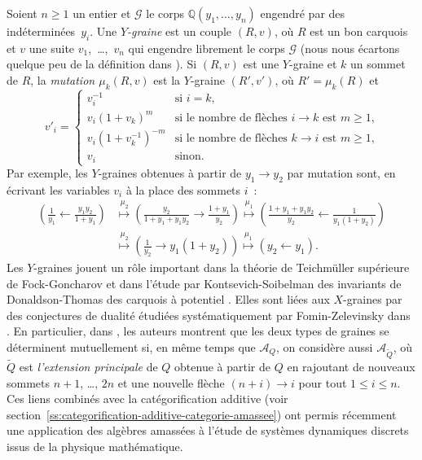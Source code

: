 \documentclass[brochure,12pt]{bourbaki}
\numberwithin{equation}{subsection}
\numberwithin{theorem}{section}
\newcommand{\Q}{\mathbb{Q}}
\newcommand{\la}{\leftarrow}
\newcommand{\ca}{{\mathcal A}}
\newcommand{\cg}{{\mathcal G}}
\renewcommand{\tilde}[1]{\widetilde{#1}}
\newcommand{\maparr}[1]{\stackrel{#1}{\mapsto}}
\begin{document}
Soient $n\geq 1$ un entier et $\cg$ le corps $\Q(y_1, \ldots, y_n)$
engendr\'e par des ind\'etermi\-n\'ees~$y_i$. Une {\em $Y$-graine} est un couple $(R,v)$, o\`u
$R$ est un bon carquois et $v$ une suite \mbox{$v_1$, \ldots, $v_n$}
qui engendre librement le corps $\cg$ (nous nous \'ecartons quelque peu de la d\'efinition
dans \cite{FominZelevinsky07}). Si $(R,v)$ est une
$Y$-graine et $k$ un sommet de $R$, la {\em mutation $\mu_k(R,v)$}
est la $Y$-graine $(R',v')$, o\`u $R'=\mu_k(R)$ et
\[
v'_i=\left\{ \begin{array}{ll} v_i^{-1} & \mbox{si $i=k$,} \\
v_i (1+v_k)^m & \mbox{si le nombre de fl\`eches $i\to k$ est $m\geq 1$,} \\
v_i (1+v_k^{-1})^{-m} & \mbox{si le nombre de fl\`eches $k\to i$ est $m\geq 1$,}\\
v_i & \mbox{sinon.}
\end{array} \right.
\]
Par exemple, les $Y$-graines obtenues \`a partir de $y_1 \to y_2$ par
mutation sont, en \'ecrivant les variables $v_i$ \`a la place
des sommets $i$~:
\begin{align*}
\left( \frac{1}{y_1} \la \frac{y_1 y_2}{1+y_1} \right) &\maparr{\mu_2}
\left( \frac{y_2}{1+y_1+y_1y_2} \to \frac{1+y_1}{y_2} \right) \maparr{\mu_1}
\left( \frac{1+y_1+y_1y_2}{y_2} \la \frac{1}{y_1(1+y_2)} \right) \\
 &\maparr{\mu_2} \left( \frac{1}{y_2} \to y_1(1+y_2) \right) \maparr{\mu_1} \left( y_2 \la y_1 \right).
\end{align*}
Les $Y$-graines jouent un r\^ole important dans la th\'eorie de
Teichm\"uller sup\'erieure de Fock-Goncharov \cite{FockGoncharov03} \cite{FockGoncharov06a}
et dans l'\'etude par Kontsevich-Soibelman \cite{KontsevichSoibelman08}
des invariants de Donaldson-Thomas des carquois \`a potentiel \cite{DerksenWeymanZelevinsky08}.
Elles sont li\'ees aux $X$-graines par des conjectures de dualit\'e
\cite{FockGoncharov03} \'etudi\'ees syst\'ematiquement par Fomin-Zelevinsky
dans \cite{FominZelevinsky07}. En particulier, dans \cite{FominZelevinsky07},
les auteurs montrent que les
deux types de graines se d\'eterminent mutuellement si, en
m\^eme temps que $\ca_Q$, on consid\`ere aussi $\ca_{\tilde{Q}}$,
o\`u $\tilde{Q}$ est {\em l'extension principale} de $Q$ obtenue
\`a partir de $Q$ en rajoutant de nouveaux sommets $n+1$, \ldots, $2n$
et une nouvelle fl\`eche $(n+i) \to i$ pour tout $1\leq i\leq n$.
Ces liens combin\'es avec la cat\'egorification additive (voir
section~\ref{ss:categorification-additive-categorie-amassee})
ont permis r\'ecemment une application des alg\`ebres amass\'ees
\`a l'\'etude de syst\`emes dynamiques discrets issus de la
physique math\'ematique.
\end{document}
